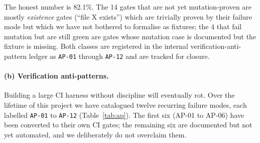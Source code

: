 \documentclass[review]{elsarticle}
\begin{document}
The honest number is 82.1\%. The 14 gates that are not yet
mutation-proven are mostly \emph{existence} gates (``file X exists'')
which are trivially proven by their failure mode but which we have
not bothered to formalise as fixtures; the 4 that fail mutation but
are still green are gates whose mutation case is documented but the
fixture is missing. Both classes are registered in the internal
verification-anti-pattern ledger as \texttt{AP-01} through
\texttt{AP-12} and are tracked for closure.

\paragraph{(b) Verification anti-patterns.}
Building a large CI harness without discipline will eventually rot.
Over the lifetime of this project we have catalogued twelve recurring
failure modes, each labelled \texttt{AP-01} to \texttt{AP-12}
(Table~\ref{tab:ap}). The first six (AP-01 to AP-06) have been
converted to their own CI gates; the remaining six are documented but
not yet automated, and we deliberately do not overclaim them.
\end{document}
